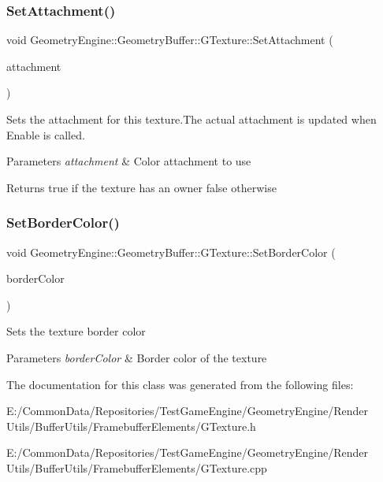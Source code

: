 \subsubsection{\texorpdfstring{SetAttachment()}{SetAttachment()}\hspace{0.1cm}{\footnotesize\ttfamily [2/2]}}
{\footnotesize\ttfamily void Geometry\+Engine\+::\+Geometry\+Buffer\+::\+G\+Texture\+::\+Set\+Attachment (\begin{DoxyParamCaption}\item[{G\+Framebuffer\+Commons\+::\+G\+\_\+\+C\+O\+L\+O\+R\+\_\+\+A\+T\+T\+A\+C\+H\+M\+E\+N\+TS}]{attachment }\end{DoxyParamCaption})}

Sets the attachment for this texture.\+The actual attachment is updated when Enable is called. 
\begin{DoxyParams}{Parameters}
{\em attachment} & Color attachment to use \\
\hline
\end{DoxyParams}
\begin{DoxyReturn}{Returns}
true if the texture has an owner false otherwise 
\end{DoxyReturn}
\mbox{\label{class_geometry_engine_1_1_geometry_buffer_1_1_g_texture_a458a06591fb47ea1c3246af4c9bae344}} 
\subsubsection{\texorpdfstring{SetBorderColor()}{SetBorderColor()}}
{\footnotesize\ttfamily void Geometry\+Engine\+::\+Geometry\+Buffer\+::\+G\+Texture\+::\+Set\+Border\+Color (\begin{DoxyParamCaption}\item[{const Q\+Vector3D \&}]{border\+Color }\end{DoxyParamCaption})}

Sets the texture border color 
\begin{DoxyParams}{Parameters}
{\em border\+Color} & Border color of the texture \\
\hline
\end{DoxyParams}


The documentation for this class was generated from the following files\+:\begin{DoxyCompactItemize}
\item 
E\+:/\+Common\+Data/\+Repositories/\+Test\+Game\+Engine/\+Geometry\+Engine/\+Render Utils/\+Buffer\+Utils/\+Framebuffer\+Elements/G\+Texture.\+h\item 
E\+:/\+Common\+Data/\+Repositories/\+Test\+Game\+Engine/\+Geometry\+Engine/\+Render Utils/\+Buffer\+Utils/\+Framebuffer\+Elements/G\+Texture.\+cpp\end{DoxyCompactItemize}
